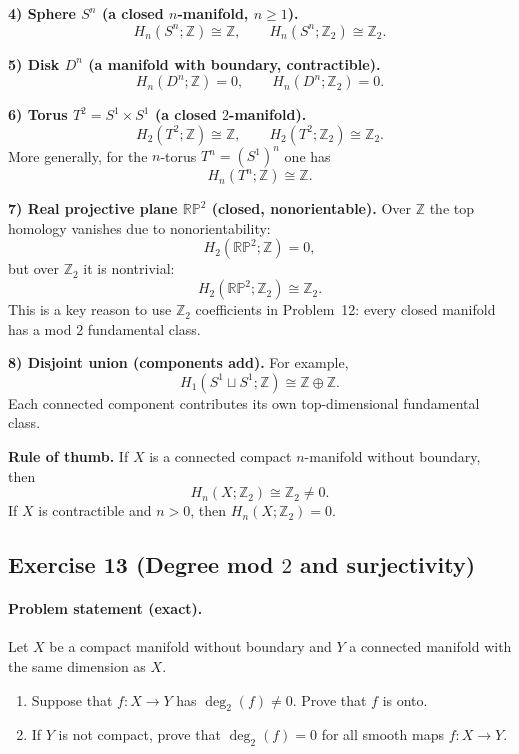 \documentclass[12pt,a4paper]{article}
\theoremstyle{plain}
\theoremstyle{definition}      %
\begin{document}
\medskip
\noindent\textbf{4) Sphere $S^n$ (a closed $n$-manifold, $n\ge 1$).}
\[
H_n(S^n;\mathbb{Z})\cong \mathbb{Z},
\qquad
H_n(S^n;\mathbb{Z}_2)\cong \mathbb{Z}_2.
\]

\medskip
\noindent\textbf{5) Disk $D^n$ (a manifold with boundary, contractible).}
\[
H_n(D^n;\mathbb{Z})=0,
\qquad
H_n(D^n;\mathbb{Z}_2)=0.
\]

\medskip
\noindent\textbf{6) Torus $T^2=S^1\times S^1$ (a closed $2$-manifold).}
\[
H_2(T^2;\mathbb{Z})\cong \mathbb{Z},
\qquad
H_2(T^2;\mathbb{Z}_2)\cong \mathbb{Z}_2.
\]
More generally, for the $n$-torus $T^n=(S^1)^n$ one has
\[
H_n(T^n;\mathbb{Z})\cong \mathbb{Z}.
\]

\medskip
\noindent\textbf{7) Real projective plane $\mathbb{RP}^2$ (closed, nonorientable).}
Over $\mathbb{Z}$ the top homology vanishes due to nonorientability:
\[
H_2(\mathbb{RP}^2;\mathbb{Z})=0,
\]
but over $\mathbb{Z}_2$ it is nontrivial:
\[
H_2(\mathbb{RP}^2;\mathbb{Z}_2)\cong \mathbb{Z}_2.
\]
This is a key reason to use $\mathbb{Z}_2$ coefficients in Problem~12: every closed manifold has a mod $2$
fundamental class.

\medskip
\noindent\textbf{8) Disjoint union (components add).}
For example,
\[
H_1(S^1\sqcup S^1;\mathbb{Z})\cong \mathbb{Z}\oplus \mathbb{Z}.
\]
Each connected component contributes its own top-dimensional fundamental class.

\medskip
\noindent\textbf{Rule of thumb.}
If $X$ is a connected compact $n$-manifold without boundary, then
\[
H_n(X;\mathbb{Z}_2)\cong \mathbb{Z}_2\neq 0.
\]
If $X$ is contractible and $n>0$, then $H_n(X;\mathbb{Z}_2)=0$.

\subsection*{Exercise 13 (Degree mod $2$ and surjectivity)}

\paragraph{Problem statement (exact).}
Let $X$ be a compact manifold without boundary and $Y$ a connected manifold with the same dimension as $X$.
\begin{enumerate}
	\item[\textbf{(i)}] Suppose that $f : X \to Y$ has $\deg_2(f) \neq 0$. Prove that $f$ is onto.
	\item[\textbf{(ii)}] If $Y$ is not compact, prove that $\deg_2(f) = 0$ for all smooth maps $f : X \to Y$.
\end{enumerate}
\end{document}
